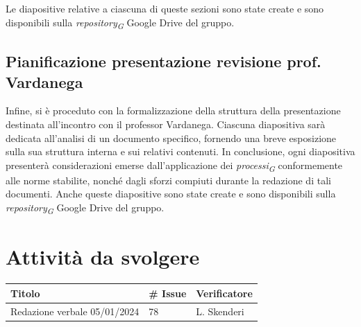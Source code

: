 \documentclass{article}
\begin{document}
Le diapositive relative a ciascuna di queste sezioni sono state create e sono disponibili sulla \textit{repository}\textsubscript{\textit{G}} Google Drive del gruppo.

\subsection{Pianificazione presentazione revisione prof. Vardanega}
Infine, si è proceduto con la formalizzazione della struttura della presentazione destinata all'incontro con il professor Vardanega. Ciascuna diapositiva sarà dedicata all'analisi di un documento specifico, fornendo una breve esposizione sulla sua struttura interna e sui relativi contenuti. In conclusione, ogni diapositiva presenterà considerazioni emerse dall'applicazione dei \textit{processi}\textsubscript{\textit{G}} conformemente alle norme stabilite, nonché dagli sforzi compiuti durante la redazione di tali documenti.
Anche queste diapositive sono state create e sono disponibili sulla \textit{repository}\textsubscript{\textit{G}} Google Drive del gruppo.


\section{Attività da svolgere}
    \begin{center}
        \begin{tabular}{|C{7cm}|C{1,5cm}|C{3cm}|}
            \hline
            \textbf{Titolo} & \textbf{\# Issue} & \textbf{Verificatore} \\
            \hline\hline
            Redazione verbale 05/01/2024 & 78 & L. Skenderi \\
            \hline
        \end{tabular}
    \end{center}
\end{document}
